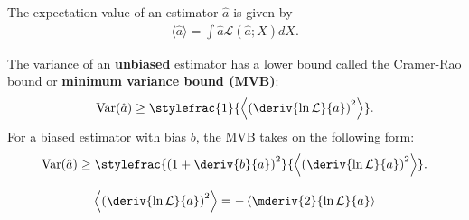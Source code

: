 {    

    \begin{property}
        The expectation value of an estimator $\hat{a}$ is given by
        \begin{gather}
            \langle\hat{a}\rangle = \int \hat{a}\mathcal{L}(\hat{a};X)dX.
        \end{gather}
    \end{property}

    \begin{theorem}
        The variance of an \textbf{unbiased} estimator has a lower bound called the Cramer-Rao bound or \textbf{minimum variance bound (MVB)}:
        \begin{gather}
            \label{statistics:theorem:minimum_variance_bound}
            \mathrm{Var}(\hat{a})\geq\stylefrac{1}{\left<\left(\deriv{\ln\mathcal{L}}{a}\right)^2\right>}.
        \end{gather}
        For a biased estimator with bias $b$, the MVB takes on the following form:
        \begin{gather}
            \label{statistics:theorem:biased_minimum_variance_bound}
            \mathrm{Var}(\hat{a})\geq\stylefrac{\left(1+\deriv{b}{a}\right)^2}{\left<\left(\deriv{\ln\mathcal{L}}{a}\right)^2\right>}.
        \end{gather}
    \end{theorem}
    \begin{remark}
        \begin{gather}
            \left<\left(\deriv{\ln\mathcal{L}}{a}\right)^2\right> = -\left<\mderiv{2}{\ln\mathcal{L}}{a}\right>
        \end{gather}
    \end{remark}

}
